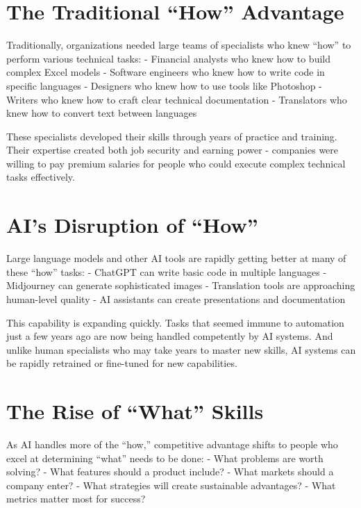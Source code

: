\documentclass[
  Letterpaper,
]{scrbook}
\begin{document}
\section{The Traditional ``How''
Advantage}\label{the-traditional-how-advantage}

Traditionally, organizations needed large teams of specialists who knew
``how'' to perform various technical tasks: - Financial analysts who
knew how to build complex Excel models - Software engineers who knew how
to write code in specific languages - Designers who knew how to use
tools like Photoshop - Writers who knew how to craft clear technical
documentation - Translators who knew how to convert text between
languages

These specialists developed their skills through years of practice and
training. Their expertise created both job security and earning power -
companies were willing to pay premium salaries for people who could
execute complex technical tasks effectively.

\section{AI's Disruption of ``How''}\label{ais-disruption-of-how}

Large language models and other AI tools are rapidly getting better at
many of these ``how'' tasks: - ChatGPT can write basic code in multiple
languages - Midjourney can generate sophisticated images - Translation
tools are approaching human-level quality - AI assistants can create
presentations and documentation

This capability is expanding quickly. Tasks that seemed immune to
automation just a few years ago are now being handled competently by AI
systems. And unlike human specialists who may take years to master new
skills, AI systems can be rapidly retrained or fine-tuned for new
capabilities.

\section{The Rise of ``What'' Skills}\label{the-rise-of-what-skills-1}

As AI handles more of the ``how,'' competitive advantage shifts to
people who excel at determining ``what'' needs to be done: - What
problems are worth solving? - What features should a product include? -
What markets should a company enter? - What strategies will create
sustainable advantages? - What metrics matter most for success?
\end{document}
